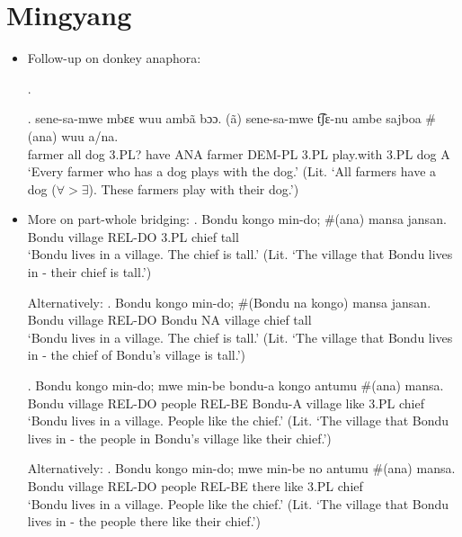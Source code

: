 \documentclass{assets/fieldnotes}
\begin{document}
\section{Mingyang}
\begin{itemize}
    \item Follow-up on donkey anaphora:

    .
    
    \exg. sene-sa-mwe mbɛɛ wuu ambã bɔɔ. (ã) sene-sa-mwe t͡ʃɛ-nu ambe sajboa \#(ana) wuu a/na.\\
    farmer all dog 3.PL? have ANA farmer DEM-PL 3.PL play.with 3.PL dog A\\
    `Every farmer who has a dog plays with the dog.' (Lit. `All farmers have a dog ($\forall > \exists$). These farmers play with their dog.')

    \item More on part-whole bridging:
    \exg. Bondu kongo min-do; \#(ana) mansa jansan.\\
    Bondu village REL-DO 3.PL chief tall\\
    `Bondu lives in a village. The chief is tall.' (Lit. `The village that Bondu lives in - their chief is tall.')

    
Alternatively:
\exg. Bondu kongo min-do; \#(Bondu na kongo) mansa jansan.\\
    Bondu village REL-DO Bondu NA village chief tall\\
    `Bondu lives in a village. The chief is tall.' (Lit. `The village that Bondu lives in - the chief of Bondu's village is tall.')

\exg. Bondu kongo min-do; mwe min-be bondu-a kongo antumu \#(ana) mansa.\\
    Bondu village REL-DO people REL-BE Bondu-A village like 3.PL chief\\
    `Bondu lives in a village. People like the chief.' (Lit. `The village that Bondu lives in - the people in Bondu's village like their chief.')

Alternatively:
\exg. Bondu kongo min-do; mwe min-be no antumu \#(ana) mansa.\\
    Bondu village REL-DO people REL-BE there like 3.PL chief\\
    `Bondu lives in a village. People like the chief.' (Lit. `The village that Bondu lives in - the people there like their chief.')


\end{itemize}
\end{document}

